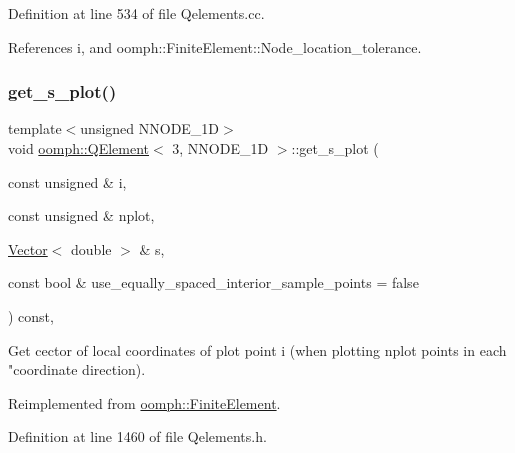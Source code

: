 Definition at line 534 of file Qelements.\+cc.



References i, and oomph\+::\+Finite\+Element\+::\+Node\+\_\+location\+\_\+tolerance.

\mbox{\label{classoomph_1_1QElement_3_013_00_01NNODE__1D_01_4_a428bcc9d0770b42d188eea1323bf66a4}} 
\subsubsection{\texorpdfstring{get\+\_\+s\+\_\+plot()}{get\_s\_plot()}}
{\footnotesize\ttfamily template$<$unsigned N\+N\+O\+D\+E\+\_\+1D$>$ \\
void \hyperlink{classoomph_1_1QElement}{oomph\+::\+Q\+Element}$<$ 3, N\+N\+O\+D\+E\+\_\+1D $>$\+::get\+\_\+s\+\_\+plot (\begin{DoxyParamCaption}\item[{const unsigned \&}]{i,  }\item[{const unsigned \&}]{nplot,  }\item[{\hyperlink{classoomph_1_1Vector}{Vector}$<$ double $>$ \&}]{s,  }\item[{const bool \&}]{use\+\_\+equally\+\_\+spaced\+\_\+interior\+\_\+sample\+\_\+points = {\ttfamily false} }\end{DoxyParamCaption}) const\hspace{0.3cm}{\ttfamily [inline]}, {\ttfamily [virtual]}}



Get cector of local coordinates of plot point i (when plotting nplot points in each "coordinate direction). 



Reimplemented from \hyperlink{classoomph_1_1FiniteElement_a82da844fd3ebb2005842464cdc148a03}{oomph\+::\+Finite\+Element}.



Definition at line 1460 of file Qelements.\+h.

\mbox{\label{classoomph_1_1QElement_3_013_00_01NNODE__1D_01_4_aaeb28afe77ae5648251f6030340acdbd}} 
